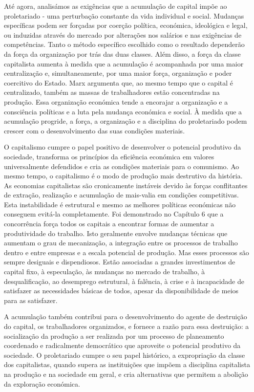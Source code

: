 Até agora, analisámos as exigências que a acumulação de capital impõe ao proletariado - uma perturbação constante da vida individual e social. Mudanças específicas podem ser forçadas por coerção política, económica, ideológica e legal, ou induzidas através do mercado por alterações nos salários e nas exigências de competências. Tanto o método específico escolhido como o resultado dependerão da força da organização por trás das duas classes. Além disso, a força da classe capitalista aumenta à medida que a acumulação é acompanhada por uma maior centralização e, simultaneamente, por uma maior força, organização e poder coercitivo do Estado. Marx argumenta que, ao mesmo tempo que o capital é centralizado, também as massas de trabalhadores estão concentradas na produção. Essa organização económica tende a encorajar a organização e a consciência políticas e a luta pela mudança económica e social. À medida que a acumulação progride, a força, a organização e a disciplina do proletariado podem crescer com o desenvolvimento das suas condições materiais.
 \par 
O capitalismo cumpre o papel positivo de desenvolver o potencial produtivo da sociedade, transforma os princípios da eficiência económica em valores universalmente defendidos e cria as condições materiais para o comunismo. Ao mesmo tempo, o capitalismo é o modo de produção mais destrutivo da história. As economias capitalistas são cronicamente instáveis ​​devido às forças conflitantes de extração, realização e acumulação de mais-valia em condições competitivas. Esta instabilidade é estrutural e mesmo as melhores políticas económicas não conseguem evitá-la completamente. Foi demonstrado no Capítulo {\color{blue}6} que a concorrência força todos os capitais a encontrar formas de aumentar a produtividade do trabalho. Isto geralmente envolve mudanças técnicas que aumentam o grau de mecanização, a integração entre os processos de trabalho dentro e entre empresas e a escala potencial de produção. Mas esses processos são sempre desiguais e dispendiosos. Estão associadas a grandes investimentos de capital fixo, à especulação, às mudanças no mercado de trabalho, à desqualificação, ao desemprego estrutural, à falência, à crise e à incapacidade de satisfazer as necessidades básicas de todos, apesar da disponibilidade de meios para as satisfazer.
 \par 
A acumulação também contribui para o desenvolvimento do agente de destruição do capital, os trabalhadores organizados, e fornece a razão para essa destruição: a socialização da produção a ser realizada por um processo de planeamento coordenado e radicalmente democrático que aproveite o potencial produtivo da sociedade. O proletariado cumpre o seu papel histórico, a expropriação da classe dos capitalistas, quando supera as instituições que impõem a disciplina capitalista na produção e na sociedade em geral, e cria alternativas que permitem a abolição da exploração económica.

